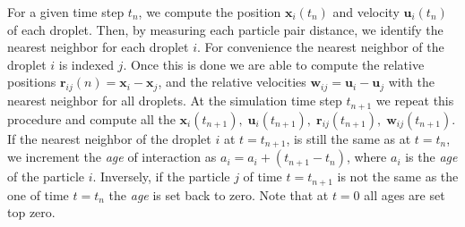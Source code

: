 For a given time step $t_n$, we compute the position $\textbf{x}_i(t_n)$ and velocity $\textbf{u}_i(t_n)$ of each droplet. 
Then, by measuring each particle pair distance, we identify the nearest neighbor for each droplet $i$. 
For convenience the nearest neighbor of the droplet $i$ is indexed $j$. 
Once this is done we are able to compute the relative positions $\textbf{r}_{ij}(n) =\textbf{x}_i - \textbf{x}_j$, and the relative velocities $\textbf{w}_{ij} = \textbf{u}_i - \textbf{u}_j$ with the nearest neighbor for all droplets. 
At the simulation time step $t_{n+1}$ we repeat this procedure and compute all the $\textbf{x}_i(t_{n+1}),\;\textbf{u}_i(t_{n+1}),\;\textbf{r}_{ij}(t_{n+1}),\;\textbf{w}_{ij}(t_{n+1})$. 
If the nearest neighbor of the droplet $i$ at $t = t_{n+1}$, is still the same as at $t = t_n$, we increment the \textit{age} of interaction as $a_i = a_i + (t_{n+1} - t_n)$, where $a_i$ is the \textit{age} of the particle $i$. 
Inversely, if the particle $j$ of time $t= t_{n+1}$ is not the same as the one of time $t=t_n$ the \textit{age} is set back to zero. 
Note that at $t = 0$ all ages are set top zero. 



